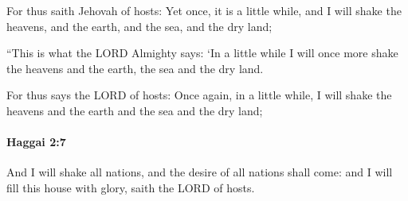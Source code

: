 			\begin{versebox}
					\item[BHS] 
					\item[LXX] 
					\item[ASV] For thus saith Jehovah of hosts: Yet once, it is a little while, and I will shake the heavens, and the earth, and the sea, and the dry land;
					\item[NIV] “This is what the LORD Almighty says: ‘In a little while I will once more shake the heavens and the earth, the sea and the dry land.
					\item[NRSV] For thus says the LORD of hosts: Once again, in a little while, I will shake the heavens and the earth and the sea and the dry land;
			\end{versebox}

		\paragraph{Haggai 2:7} %
			\label{HAGGAI-2-7}

			And I will shake all nations, and the desire of all nations shall come: and I will fill this house with glory, saith the LORD of hosts.

